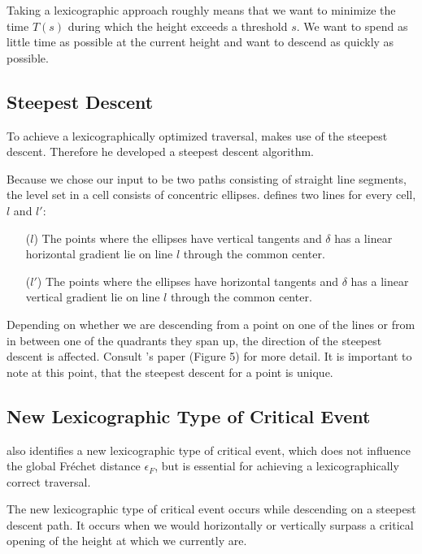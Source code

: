 Taking a lexicographic approach roughly means that we want to minimize the time $T(s)$ during which the height exceeds a threshold $s$.\cite{rotelex} We want to spend as little time as possible at the current height and want to descend as quickly as possible.

\subsection{Steepest Descent}

To achieve a lexicographically optimized traversal, \citeauthor{rotelex} makes use of the steepest descent. Therefore he developed a steepest descent algorithm.

Because we chose our input to be two paths consisting of straight line segments, the level set in a cell consists of concentric ellipses. \citeauthor{rotelex} defines two lines for every cell, $l$ and $l'$:

\begin{itemize}
	\item [($l$)] The points where the ellipses have vertical tangents and $\delta$ has a linear horizontal gradient lie on line $l$ through the common center.\cite{rotelex}
	\item [($l'$)] The points where the ellipses have horizontal tangents and $\delta$ has a linear vertical gradient lie on line $l$ through the common center.\cite{rotelex}
\end{itemize}

Depending on whether we are descending from a point on one of the lines or from in between one of the quadrants they span up, the direction of the steepest descent is affected. Consult \citeauthor{rotelex}'s paper \cite{rotelex} (Figure 5) for more detail. It is important to note at this point, that the steepest descent for a point is unique.


\subsection{New Lexicographic Type of Critical Event}

\citeauthor{rotelex} also identifies a new lexicographic type of critical event, which does not influence the global Fréchet distance $\epsilon_F$, but is essential for achieving a lexicographically correct traversal.

The new lexicographic type of critical event occurs while descending on a steepest descent path. It occurs when we would horizontally or vertically surpass a critical opening of the height at which we currently are.


